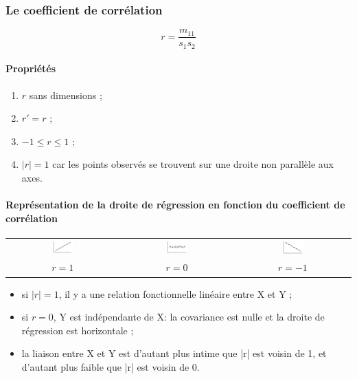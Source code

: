 \subsubsection{Le coefficient de corrélation}
$$\boxed{r=\frac{m_{11}}{s_1s_2}}$$
\paragraph{Propriétés}
\begin{enumerate}
	\item $r$ sans dimensions ;
	\item $r' = r$ ;
	\item $-1 \leq r \leq 1$ ;
	\item $|r| = 1$ car les points observés se trouvent sur une droite non parallèle aux axes.
\end{enumerate}
\paragraph{Représentation de la droite de régression en fonction du coefficient de corrélation}
\begin{center}
	\begin{tabular}{ccc}
		\includegraphics[width=0.2\textwidth]{images/coefficient-correlation1.pdf}&
		\includegraphics[width=0.2\textwidth]{images/coefficient-correlation0.pdf}&
		\includegraphics[width=0.2\textwidth]{images/coefficient-correlation-1.pdf}\\
		$r=1$&$r=0$&$r=-1$\\
	\end{tabular}
\end{center}
\begin{itemize}
	\item si $|r| = 1$, il y a une relation fonctionnelle linéaire entre X et Y ;
	\item si $r = 0$, Y est indépendante de X: la covariance est nulle et la droite de régression est horizontale ;
	\item la liaison entre X et Y est d’autant plus intime que |r| est voisin de 1, et d’autant plus faible que |r| est voisin de 0.
\end{itemize}








